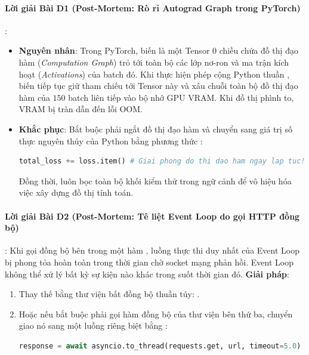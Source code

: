 \paragraph{Lời giải Bài D1 (Post-Mortem: Rò rỉ Autograd Graph trong PyTorch)}:
\begin{itemize}
  \item \textbf{Nguyên nhân}: Trong PyTorch, biến  là một Tensor 0 chiều chứa đồ thị đạo hàm (\textit{Computation Graph}) trỏ tới toàn bộ các lớp nơ-ron và ma trận kích hoạt (\textit{Activations}) của batch đó. Khi thực hiện phép cộng Python thuần , biến  tiếp tục giữ tham chiếu tới Tensor này và xâu chuỗi toàn bộ đồ thị đạo hàm của $150$ batch liên tiếp vào bộ nhớ GPU VRAM. Khi đồ thị phình to, VRAM bị tràn dẫn đến lỗi OOM.
  \item \textbf{Khắc phục}: Bắt buộc phải ngắt đồ thị đạo hàm và chuyển sang giá trị số thực nguyên thủy của Python bằng phương thức :
  \begin{lstlisting}[language=Python]
  total_loss += loss.item() # Giai phong do thi dao ham ngay lap tuc!
  \end{lstlisting}
  Đồng thời, luôn bọc toàn bộ khối kiểm thử trong ngữ cảnh  để vô hiệu hóa việc xây dựng đồ thị tính toán.
\end{itemize}

\paragraph{Lời giải Bài D2 (Post-Mortem: Tê liệt Event Loop do gọi HTTP đồng bộ)}:
Khi gọi  đồng bộ bên trong một hàm , luồng thực thi duy nhất của Event Loop bị phong tỏa hoàn toàn trong thời gian chờ socket mạng phản hồi. Event Loop không thể xử lý bất kỳ sự kiện nào khác trong suốt thời gian đó.
\textbf{Giải pháp}:
\begin{enumerate}
  \item Thay thế bằng thư viện bất đồng bộ thuần túy: .
  \item Hoặc nếu bắt buộc phải gọi hàm đồng bộ của thư viện bên thứ ba, chuyển giao nó sang một luồng riêng biệt bằng :
  \begin{lstlisting}[language=Python]
  response = await asyncio.to_thread(requests.get, url, timeout=5.0)
  \end{lstlisting}
\end{enumerate}
